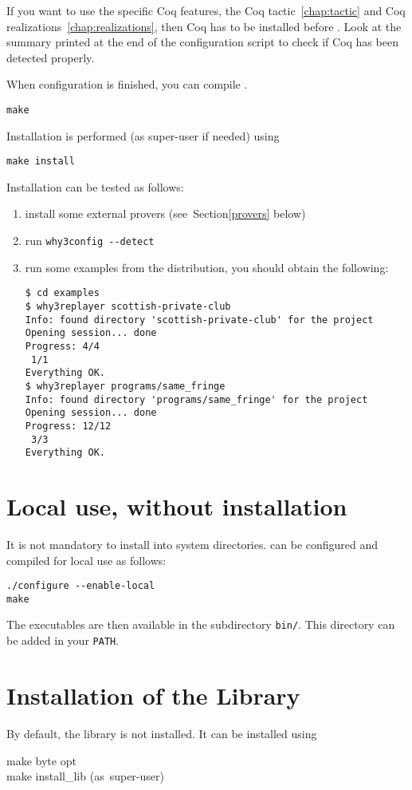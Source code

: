 If you want to use the specific Coq features, \ie the Coq
tactic~\ref{chap:tactic} and Coq realizations~\ref{chap:realizations},
then Coq has to be installed before \why. Look at the summary printed
at the end of the configuration script to check if Coq has been
detected properly.

When configuration is finished, you can compile \why.
\begin{verbatim}
make
\end{verbatim}
Installation is performed (as super-user if needed) using
\begin{verbatim}
make install
\end{verbatim}
Installation can be tested as follows: 
\begin{enumerate}
\item install some external provers (see~Section\ref{provers} below)
\item run \verb|why3config --detect|
\item run some examples from the distribution, \eg you should
obtain the following:
\begin{verbatim}
$ cd examples
$ why3replayer scottish-private-club
Info: found directory 'scottish-private-club' for the project
Opening session... done
Progress: 4/4
 1/1
Everything OK.
$ why3replayer programs/same_fringe
Info: found directory 'programs/same_fringe' for the project
Opening session... done
Progress: 12/12
 3/3
Everything OK.
\end{verbatim}
\end{enumerate}

\section{Local use, without installation}

It is not mandatory to install \why into system directories.
\why can be configured and compiled for local use as follows:
\begin{verbatim}
./configure --enable-local
make
\end{verbatim}
The \why executables are then available in the subdirectory
\texttt{bin/}. This directory can be added in your \texttt{PATH}.

\section{Installation of the \why Library}
\label{sec:installlib}

By default, the \why library is not installed. It can be installed using
\begin{flushleft}\ttfamily
make byte opt \\
make install\_lib \mbox{\rmfamily (as super-user)}
\end{flushleft}


